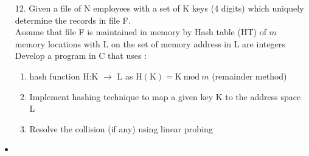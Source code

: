 \documentclass{article}
\newcommand{\answer}{\item [$\rightarrow$]}
\begin{document}
	\begin{itemize}
		\item [12. ] Given a file of N employees with a set of K keys (4 digits) which uniquely determine the records in file F. \\
		Assume that file F is maintained in memory by Hash table (HT) of $m$ memory locations with L on the set of memory address in L are integers \\
		Develop a program in C that uses :
		\begin{enumerate}[label=\alph* .]
			\item hash function H:K $\rightarrow$ L as $\text{H}(\text{K})=\text{K} ~\text{mod}~ m$ (remainder method)
			\item Implement hashing technique to map a given key K to the address space L
			\item Resolve the collision (if any) using linear probing
		\end{enumerate}

		\answer \inputminted{c}{../../Program12.c}
	\end{itemize}
\end{document}
